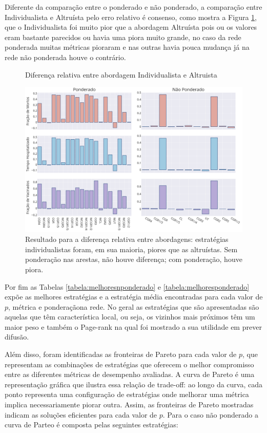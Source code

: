 Diferente da comparação entre o ponderado e não ponderado, a comparação entre Individualista e Altruísta pelo erro relativo é consenso, como mostra a Figura \ref{fig:compara_altruismo}, que o Individualista foi muito pior que a abordagem Altruísta pois ou os valores eram bastante parecidos ou havia uma piora muito grande, no caso da rede ponderada muitas métricas pioraram e nas outras havia pouca mudança já na rede não ponderada houve o contrário.
\begin{figure}[H]
    \centering
    \captionsetup{font=normalsize,skip=0.8pt,singlelinecheck=on,labelsep=endash}
    \caption{Diferença relativa entre abordagem Individualista e Altruista}
    
    \includegraphics[scale= 0.3]{figuras/compara_altruismo_0.0.png}
    \captionsetup{font=small,justification=justified}
    \caption*{Resultado para a diferença relativa entre abordagens: estratégias individualistas foram, em sua maioria, piores que as altruístas. Sem ponderação nas arestas, não houve diferença; com ponderação, houve piora.}
    \label{fig:compara_altruismo}
\end{figure}

Por fim as Tabelas \ref{tabela:melhoresnponderado} e \ref{tabela:melhoresponderado} expõe as melhores estratégias e a estratégia média encontradas para cada valor de $p$, métrica e ponderaçãona rede. No geral as estratégias que são apresentadas são aquelas que têm característica local, ou seja, os vizinhos mais próximos têm um maior peso e também o Page-rank na qual foi mostrado a sua utilidade em prever difusão.

Além disso, foram identificadas as fronteiras de Pareto para cada valor de \( p \), que representam as combinações de estratégias que oferecem o melhor compromisso entre as diferentes métricas de desempenho avaliadas. A curva de Pareto é uma representação gráfica que ilustra essa relação de trade-off: ao longo da curva, cada ponto representa uma configuração de estratégias onde melhorar uma métrica implica necessariamente piorar outra. Assim, as fronteiras de Pareto mostradas indicam as soluções eficientes para cada valor de \( p \). Para o caso não ponderado a curva de Parteo é composta pelas seguintes estratégias:

